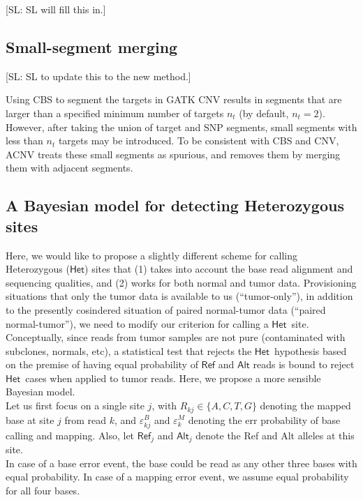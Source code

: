 \documentclass[nofootinbib,amssymb,amsmath]{revtex4}
\def\SL#1{{\color [rgb]{0,0,0.8} [SL: #1]}}
\newcommand{\HET}{$\mathsf{Het}$}
\begin{document}
\SL{SL will fill this in.}

\subsection{Small-segment merging} \label{small-segment-merging}

\SL{SL to update this to the new method.}

Using CBS to segment the targets in GATK CNV results in segments that are larger than a specified minimum number of targets $n_t$ (by default, $n_t = 2$).  However, after taking the union of target and SNP segments, small segments with less than $n_t$ targets may be introduced.  To be consistent with CBS and CNV, ACNV treats these small segments as spurious, and removes them by merging them with adjacent segments.

\subsection{A Bayesian model for detecting Heterozygous sites}
Here, we would like to propose a slightly different scheme for calling Heterozygous (\HET) sites that (1) takes into account the base read alignment and sequencing qualities, and (2) works for both normal and tumor data. Provisioning situations that only the tumor data is available to us (``tumor-only''), in addition to the presently cosindered situation of paired normal-tumor data (``paired normal-tumor''), we need to modify our criterion for calling a \HET~site. Conceptually, since reads from tumor samples are not pure (contaminated with subclones, normals, etc), a statistical test that rejects the \HET~hypothesis based on the premise of having equal probability of $\mathsf{Ref}$ and $\mathsf{Alt}$ reads is bound to reject \HET~cases when applied to tumor reads. Here, we propose a more sensible Bayesian model.\\

 Let us first focus on a single site $j$, with $R_{kj} \in \{A, C, T, G\}$ denoting the mapped base at site $j$ from read $k$, and $\varepsilon^B_{kj}$ and $\varepsilon^M_k$ denoting the err probability of base calling and mapping. Also, let $\mathsf{Ref}_j$ and $\mathsf{Alt}_j$ denote the Ref and Alt alleles at this site.\\

 In case of a base error event, the base could be read as any other three bases with equal probability. In case of a mapping error event, we assume equal probability for all four bases.\\
\end{document}
